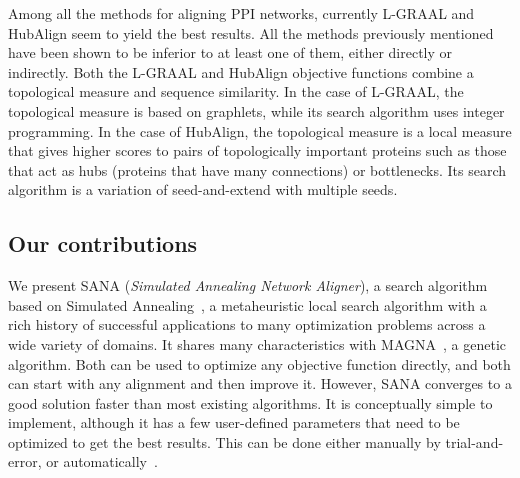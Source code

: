 \documentclass{bioinfo}
\begin{document}
Among all the methods for aligning PPI networks, currently L-GRAAL \citep{LGRAAL} and HubAlign \citep{HubAlign} seem to yield the best results. All the methods previously mentioned have been shown to be inferior to at least one of them, either directly or indirectly. Both the L-GRAAL and HubAlign objective functions combine a topological measure and sequence similarity. In the case of L-GRAAL, the topological measure is based on graphlets, while its search algorithm uses integer programming. In the case of HubAlign, the topological measure is a local measure that gives higher scores to pairs of topologically important proteins such as those that act as hubs (proteins that have many connections) or bottlenecks. Its search algorithm is a variation of seed-and-extend with multiple seeds.

\subsection{Our contributions}

We present SANA (\textit{Simulated Annealing Network Aligner}), a search algorithm based on Simulated Annealing~\citep{SA1,SA2}, a metaheuristic local search algorithm with a rich history of successful applications to many optimization problems across a wide variety of domains.
It shares many characteristics with MAGNA~\citep{MAGNA}, a genetic algorithm. Both can be used to optimize any objective function directly, and both can start with any alignment and then improve it. However, SANA converges to a good solution faster than most existing algorithms.
It is conceptually simple to implement, although it has a few user-defined parameters that need to be optimized to get the best results. This can be done either manually by trial-and-error, or automatically~\citep{autosa}.
\end{document}
